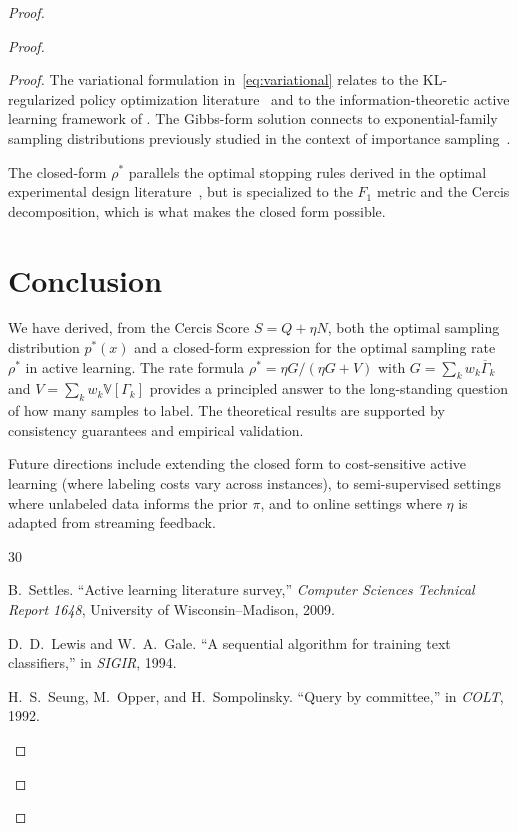 \documentclass[12pt,a4paper]{article}
\newcommand{\V}{\mathbb{V}}
\begin{document}
\begin{proof}
\begin{proof}
\begin{proof}
The variational formulation in~\eqref{eq:variational} relates to the
KL-regularized policy optimization literature~\citep{levine2018reinforcement}
and to the information-theoretic active learning framework of
\citet{houlsby2011bayesian}.  The Gibbs-form solution connects to
exponential-family sampling distributions previously studied in the context
of importance sampling~\citep{liu2016stein}.

The closed-form $\rho^*$ parallels the optimal stopping rules derived in the
optimal experimental design literature~\citep{pukelsheim2006optimal}, but is
specialized to the $F_1$ metric and the Cercis decomposition, which is what
makes the closed form possible.

\section{Conclusion}

We have derived, from the Cercis Score $S=Q+\eta N$, both the optimal
sampling distribution $p^*(x)$ and a closed-form expression for the
optimal sampling rate $\rho^*$ in active learning.  The rate formula
$\rho^*=\eta G/(\eta G+V)$ with $G=\sum_k w_k\overline{\Gamma}_k$ and
$V=\sum_k w_k\V[\Gamma_k]$
provides a principled answer to the long-standing question of how many
samples to label.  The theoretical results are supported by consistency
guarantees and empirical validation.

Future directions include extending the closed form to cost-sensitive
active learning (where labeling costs vary across instances), to
semi-supervised settings where unlabeled data informs the prior $\pi$, and
to online settings where $\eta$ is adapted from streaming feedback.


\begin{thebibliography}{30}

B.~Settles.
\newblock ``Active learning literature survey,''
\newblock \emph{Computer Sciences Technical Report 1648}, University of
Wisconsin--Madison, 2009.

D.~D.~Lewis and W.~A.~Gale.
\newblock ``A sequential algorithm for training text classifiers,''
\newblock in \emph{SIGIR}, 1994.

H.~S.~Seung, M.~Opper, and H.~Sompolinsky.
\newblock ``Query by committee,''
\newblock in \emph{COLT}, 1992.


\end{thebibliography}
\end{proof}
\end{proof}
\end{proof}
\end{document}
